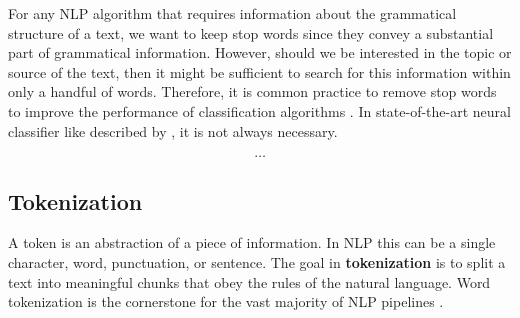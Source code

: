   For any NLP algorithm that requires information about the grammatical structure of a text, we want to keep stop words since they convey a substantial part of grammatical information.
  However, should we be interested in the topic or source of the text, then it might be sufficient to search for this information within only a handful of words.
  Therefore, it is common practice to remove stop words to improve the performance of classification algorithms \citep{McCallum1998, Lodhi2002, Tong2001}.
  In state-of-the-art neural classifier like described by \cite{Howard2018}, it is not always necessary.

\[\dots\]

\subsection{Tokenization}\label{tokenization}
  A token is an abstraction of a piece of information.
  In NLP this can be a single character, word, punctuation, or sentence.
  The goal in \textbf{tokenization} is to split a text into meaningful chunks that obey the rules of the natural language.
  Word tokenization is the cornerstone for the vast majority of NLP pipelines \citep{Webster1992}.

